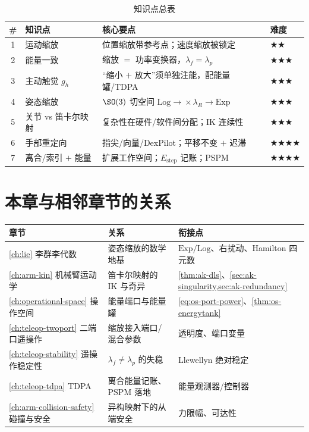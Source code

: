 \begin{table}[H]\centering\small
\caption{知识点总表}
\label{tab:tm-overview}
\begin{tabular}{clll}
\toprule
\# & 知识点 & 核心要点 & 难度 \\
\midrule
1 & 运动缩放 & 位置缩放带参考点；速度缩放被锁定 & \(\bigstar\bigstar\) \\
2 & 能量一致 & 缩放 $=$ 功率变换器，$\lambda_f=\lambda_p$ & \(\bigstar\bigstar\bigstar\) \\
3 & 主动触觉 $g_h$ & “缩小 $+$ 放大”须单独注能，配能量罐/TDPA & \(\bigstar\bigstar\bigstar\) \\
4 & 姿态缩放 & $\SO(3)$ 切空间 $\mathrm{Log}\!\to\!\times\lambda_R\!\to\!\mathrm{Exp}$ & \(\bigstar\bigstar\bigstar\) \\
5 & 关节 vs 笛卡尔映射 & 复杂性在硬件/软件间分配；IK 连续性 & \(\bigstar\bigstar\bigstar\) \\
6 & 手部重定向 & 指尖/向量/DexPilot；平移不变 $+$ 迟滞 & \(\bigstar\bigstar\bigstar\bigstar\) \\
7 & 离合/索引 $+$ 能量 & 扩展工作空间；$E_{\text{step}}$ 记账；PSPM & \(\bigstar\bigstar\bigstar\bigstar\) \\
\bottomrule
\end{tabular}
\end{table}

\section*{本章与相邻章节的关系}
\begin{table}[H]\centering\small
\begin{tabular}{lll}
\toprule
章节 & 关系 & 衔接点 \\
\midrule
\cref{ch:lie} 李群李代数 & 姿态缩放的数学地基 & $\mathrm{Exp}/\mathrm{Log}$、右扰动、Hamilton 四元数 \\
\cref{ch:arm-kin} 机械臂运动学 & 笛卡尔映射的 IK 与奇异 & \cref{thm:ak-dls}、\cref{sec:ak-singularity,sec:ak-redundancy} \\
\cref{ch:operational-space} 操作空间 & 能量端口与能量罐 & \cref{eq:os-port-power}、\cref{thm:os-energytank} \\
\cref{ch:teleop-twoport} 二端口遥操作 & 缩放接入端口/混合参数 & 透明度、端口变量 \\
\cref{ch:teleop-stability} 遥操作稳定性 & $\lambda_f\neq\lambda_p$ 的失稳 & Llewellyn 绝对稳定 \\
\cref{ch:teleop-tdpa} TDPA & 离合能量记账、PSPM 落地 & 能量观测器/控制器 \\
\cref{ch:arm-collision-safety} 碰撞与安全 & 异构映射下的从端安全 & 力限幅、可达性 \\
\bottomrule
\end{tabular}
\end{table}

